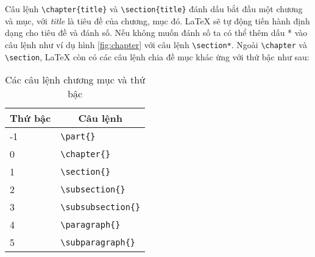 Câu lệnh \verb=\chapter{title}= và \verb=\section{title}= đánh dấu bắt đầu một chương và mục,
với \textit{title} là tiêu đề của chương, mục đó. LaTeX sẽ tự động tiến hành định dạng cho tiêu
đề và đánh số. Nếu không muốn đánh số ta có thể thêm dấu * vào câu lệnh như ví dụ hình \ref{fig:chapter}
với câu lệnh \verb=\section*=. Ngoài \verb=\chapter= và \verb=\section=, LaTeX còn có
các câu lệnh chia đề mục khác ứng với thứ bậc như sau:\par
\begin{table}[H]
 \centering
 \begin{tabular}{ |l|l| }%
  \hline
  \multicolumn{1}{|c}{Thứ bậc} & \multicolumn{1}{|c|}{Câu lệnh} \\
  \hline
  -1 & \verb=\part{}= \\
  0  & \verb=\chapter{}= \\
  1  & \verb=\section{}= \\
  2  & \verb=\subsection{}= \\
  3  & \verb=\subsubsection{}= \\
  4  & \verb=\paragraph{}= \\
  5  & \verb=\subparagraph{}= \\
  \hline
 \end{tabular}
 \caption{Các câu lệnh chương mục và thứ bậc}
 \label{tab:chapter}
\end{table}

